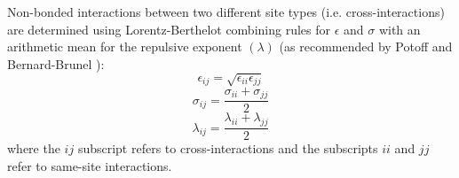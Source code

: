 \documentclass[journal=jctc,manuscript=article]{achemso}
\begin{document}
Non-bonded interactions between two different site types (i.e. cross-interactions) are determined using Lorentz-Berthelot combining rules \cite{Allen1987} for $\epsilon$ and $\sigma$ with an arithmetic mean for the repulsive exponent $(\lambda)$ (as recommended by Potoff and Bernard-Brunel \cite{Mie}):
\begin{equation} \label{eq:Lorentz-Berthelot_eps}
\epsilon_{ij} = \sqrt{\epsilon_{ii} \epsilon_{jj}}
\end{equation}
\begin{equation} \label{eq:Lorentz-Berthelot_sig}
\sigma_{ij} = \frac{\sigma_{ii} + \sigma_{jj}}{2}
\end{equation}
\begin{equation} \label{eq:Lorentz-Berthelot_lam}
\lambda_{ij} = \frac{\lambda_{ii} + \lambda_{jj}}{2}
\end{equation}
where the $ij$ subscript refers to cross-interactions and the subscripts $ii$ and $jj$ refer to same-site interactions. 

\end{document}
